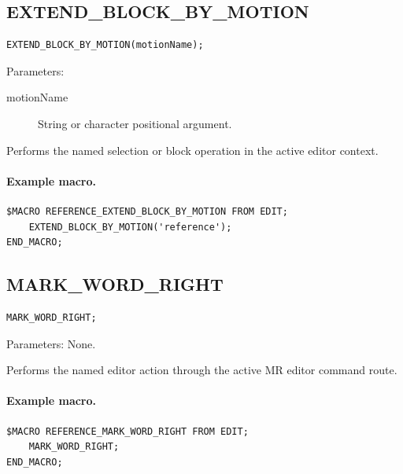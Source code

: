 \documentclass[a4paper,10pt,twoside,openany]{book}
\newenvironment{mrmacextension}{\begin{changebar}}{\end{changebar}}
\begin{document}
\begin{mrmacextension}
\label{prim:procedure-extend-block-by-motion}
\subsection*{EXTEND\_BLOCK\_BY\_MOTION}
\begin{verbatim}
EXTEND_BLOCK_BY_MOTION(motionName);
\end{verbatim}
Parameters:
\begin{description}
\item[motionName] String or character positional argument.
\end{description}

Performs the named selection or block operation in the active editor context.

\paragraph{Example macro.}
\begin{verbatim}
$MACRO REFERENCE_EXTEND_BLOCK_BY_MOTION FROM EDIT;
    EXTEND_BLOCK_BY_MOTION('reference');
END_MACRO;
\end{verbatim}
\end{mrmacextension}

\begin{mrmacextension}
\label{prim:procedure-mark-word-right}
\subsection*{MARK\_WORD\_RIGHT}
\begin{verbatim}
MARK_WORD_RIGHT;
\end{verbatim}
Parameters: None.

Performs the named editor action through the active MR editor command route.

\paragraph{Example macro.}
\begin{verbatim}
$MACRO REFERENCE_MARK_WORD_RIGHT FROM EDIT;
    MARK_WORD_RIGHT;
END_MACRO;
\end{verbatim}
\end{mrmacextension}

\label{prim:procedure-move-block}
\end{document}
